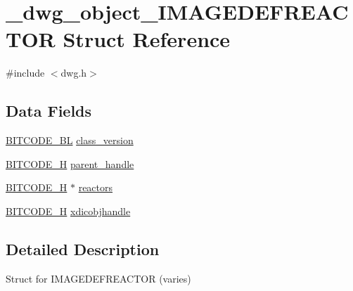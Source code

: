 \hypertarget{struct__dwg__object__IMAGEDEFREACTOR}{\section{\-\_\-dwg\-\_\-object\-\_\-\-I\-M\-A\-G\-E\-D\-E\-F\-R\-E\-A\-C\-T\-O\-R \-Struct \-Reference}
\label{struct__dwg__object__IMAGEDEFREACTOR}
}


{\ttfamily \#include $<$dwg.\-h$>$}

\subsection*{\-Data \-Fields}
\begin{DoxyCompactItemize}
\item 
\hyperlink{dwg_8h_aebd5f127038868cbabc3d55d91da776c}{\-B\-I\-T\-C\-O\-D\-E\-\_\-\-B\-L} \hyperlink{struct__dwg__object__IMAGEDEFREACTOR_ac16c68d51e74d970cae9477ae6149a96}{class\-\_\-version}
\item 
\hyperlink{dwg_8h_a7c700e94e047a97ba8c24bdfe4029dc3}{\-B\-I\-T\-C\-O\-D\-E\-\_\-\-H} \hyperlink{struct__dwg__object__IMAGEDEFREACTOR_ac32a9bfaac5f6649ebed8de55c87159e}{parent\-\_\-handle}
\item 
\hyperlink{dwg_8h_a7c700e94e047a97ba8c24bdfe4029dc3}{\-B\-I\-T\-C\-O\-D\-E\-\_\-\-H} $\ast$ \hyperlink{struct__dwg__object__IMAGEDEFREACTOR_a11a49bf6691f8328591b2330bac9c6a2}{reactors}
\item 
\hyperlink{dwg_8h_a7c700e94e047a97ba8c24bdfe4029dc3}{\-B\-I\-T\-C\-O\-D\-E\-\_\-\-H} \hyperlink{struct__dwg__object__IMAGEDEFREACTOR_aad22f8bee64a1953321dd506a581f3a1}{xdicobjhandle}
\end{DoxyCompactItemize}


\subsection{\-Detailed \-Description}
\-Struct for \-I\-M\-A\-G\-E\-D\-E\-F\-R\-E\-A\-C\-T\-O\-R (varies) 

